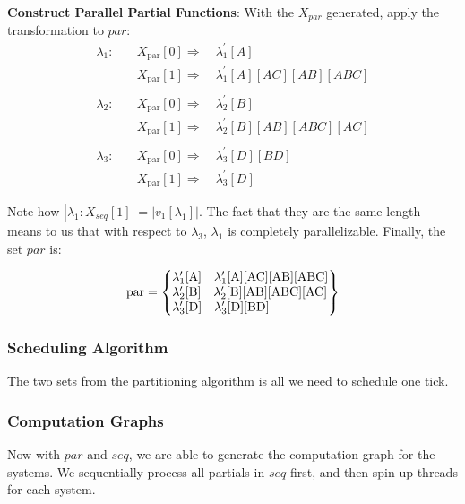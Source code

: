 \textbf{Construct Parallel Partial Functions}: With the $X_{par}$ generated, apply the transformation to $par$:
\begin{align*}
    \lambda_1: \quad & X_{\text{par}}[0]  \Rightarrow \quad \lambda_1^\prime[A] \\
                     & X_{\text{par}}[1]  \Rightarrow \quad \lambda_1^\prime[A][AC][AB][ABC] \\ 
    \\[0.3em]
    \lambda_2: \quad & X_{\text{par}}[0]  \Rightarrow \quad \lambda_2^\prime[B] \\
                     & X_{\text{par}}[1]  \Rightarrow \quad \lambda_2^\prime[B][AB][ABC][AC] \\
    \\[0.3em]
    \lambda_3: \quad & X_{\text{par}}[0]  \Rightarrow \quad \lambda_3^\prime[D][BD] \\
                     & X_{\text{par}}[1]  \Rightarrow \quad \lambda_3^\prime[D]
\end{align*}

Note how $|\lambda_1:X_{seq}[1]| = |v_1[\lambda_1]|$. The fact that they are the same length means to us that with respect to $\lambda_3$, $\lambda_1$ is completely parallelizable. Finally, the set $par$ is:

$$
\text{par} = \left\{
\begin{array}{@{}l@{}}
    \lambda_1^\prime[\text{A}] \quad \lambda_1^\prime[\text{A}][\text{AC}][\text{AB}][\text{ABC}] \\ 
    \lambda_2^\prime[\text{B}] \quad \lambda_2^\prime[\text{B}][\text{AB}][\text{ABC}][\text{AC}] \\
    \lambda_3^\prime[\text{D}] \quad \lambda_3^\prime[\text{D}][\text{BD}]
\end{array}
\right\}
$$

\subsubsection{Scheduling Algorithm}
The two sets from the partitioning algorithm is all we need to schedule one tick.


\subsubsection{Computation Graphs}
Now with $par$ and $seq$, we are able to generate the computation graph for the systems. We sequentially process all partials in $seq$ first, and then spin up threads for each system. 

